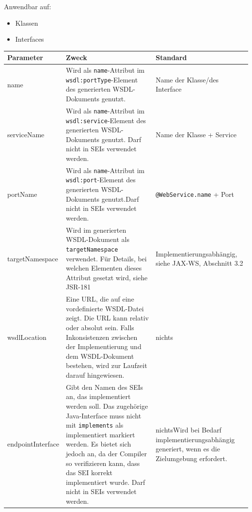 \documentclass[runningheads]{llncs}
\newcommand{\germanquote}[1]{\glqq{}#1\grqq{}}
\newcommand{\anntabwidth}{\textwidth}
\begin{document}
      \noindent{}Anwendbar auf:
      \begin{itemize}
       \item Klassen
       \item Interfaces\vfill
      \end{itemize}
    \begin{tabulary}{\anntabwidth}{|l|L|L|}
    \hline
    \textbf{Parameter} & \textbf{Zweck} & \textbf{Standard} \\
    \hline
      name &
      Wird als \texttt{name}-Attribut im \texttt{wsdl:portType}-Element des generierten
      WSDL-\linebreak[0]Dokuments genutzt. &
      Name der Klasse/\linebreak[0]des Interface \\
    \hline
      serviceName &
      Wird als \texttt{name}-Attribut im \texttt{wsdl:service}-Element des generierten
      WSDL-\linebreak[0]Dokuments genutzt. Darf nicht in SEIs verwendet werden. &
      Name der Klasse + \germanquote{Ser\-vice} \\
    \hline
      portName &
      Wird als \texttt{name}-Attribut im \texttt{wsdl:port}-Element des generierten
      WSDL-\linebreak[0]Dokuments genutzt.\newline Darf nicht in SEIs verwendet werden. &
      \texttt{@WebService.name} + \germanquote{Port} \\
    \hline
      targetNamespace &
      Wird im generierten WSDL-Dokument als \texttt{targetNamespace} verwendet. Für Details, bei
      welchen Elementen dieses Attribut gesetzt wird, siehe JSR-181\cite{jsr_181} &
      Im\-ple\-men\-tier\-ungs\-ab\-häng\-ig, siehe JAX-WS\cite{jsr_224}, Abschnitt 3.2 \\
    \hline
      wsdlLocation &
      Eine URL, die auf eine vordefinierte WSDL-Datei zeigt. Die URL kann relativ oder absolut
      sein. Falls Inkonsistenzen zwischen der Implementierung und dem WSDL-Dokument bestehen, wird
      zur Laufzeit darauf hingewiesen. &
      nichts \\
    \hline
      endpointInterface &
      Gibt den Namen des SEIs an, das implementiert werden soll. Das zugehörige Java-Interface muss
      nicht mit \texttt{implements} als implementiert markiert werden. Es bietet sich jedoch an, da
      der Compiler so verifizieren kann, dass das SEI korrekt implementiert wurde.\newline\newline
      Darf nicht in SEIs verwendet werden. &
      nichts\newline \newline Wird bei Bedarf im\-ple\-men\-tier\-ungs\-ab\-häng\-ig generiert,
      wenn es die Zielumgebung erfordert. \\
    \hline
    \end{tabulary} \vfill
\end{document}
